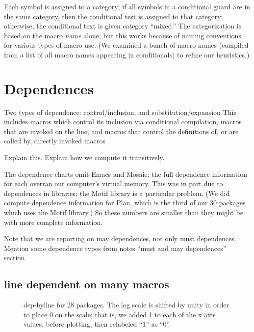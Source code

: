 \documentclass[10pt]{article}
\begin{document}
      Each symbol is assigned to a category; if all symbols in a
      conditional guard are in the same category, then the conditional test
      is assigned to that category; otherwise, the conditional text is
      given category ``mixed.''  The categorization is based on the macro
      {\em name} alone; but this works because of naming conventions for
      various types of macro use.  (We examined a bunch of macro names
      (compiled from a list of all macro names appearing in conditionals)
      to refine our heuristics.)


{}


\section{Dependences}
\label{sec:dependence}

 Two types of dependence:  control/inclusion, and substitution/expansion
     This includes macros which control its inclusion via conditional
     compilation, macros that are invoked on the line, and macros that
     control the definitions of, or are called by, directly invoked macros

 Explain this.  Explain how we compute it transitively.
 
 The dependence charts omit Emacs and Mosaic; the full dependence
 information for each overran our computer's virtual memory.  This was in
 part due to dependences in libraries; the Motif library is a particular
 problem.  (We did compute dependence information for Plan, which is the
 third of our 30 packages which uses the Motif library.)  So these numbers
 are smaller than they might be with more complete information.

Note that we are reporting on may dependences, not only must dependences.
Mention some dependence types from notes ``must and may dependences'' section.

\subsection{line dependent on many macros}

\begin{figure}
\centerline{}
\caption{dep-byline for 28 packages.
The log scale is shifted by unity in order to place 0 on the scale; that
is, we added 1 to each of the x axis values, before plotting, then
relabeled ``1'' as ``0''.}
\label{fig:dep-byline}
\end{figure}
\end{document}

